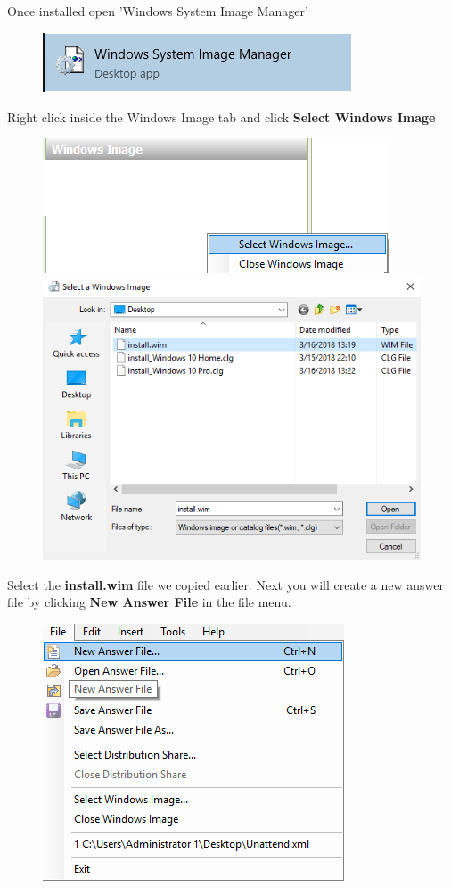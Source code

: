 \documentclass{article}
\begin{document}
\subsection{}
Once installed open 'Windows System Image Manager'
\begin{figure}[h]
	\includegraphics[width=.5\linewidth]{"sysprep/3-23-2018 13-21-27"}
\end{figure}
Right click inside the Windows Image tab and click \textbf{Select Windows Image}
\begin{figure}[h]
	\includegraphics[width=.5\linewidth]{"sysprep/3-23-2018 13-48-20"}
	\includegraphics[width=.5\linewidth]{"sysprep/3-23-2018 13-25-37"}
\end{figure}
\newline Select the \textbf{install.wim} file we copied earlier.
\newline Next you will create a new answer file by clicking \textbf{New Answer File} in the file menu.
\begin{figure}[h]
	\centering
	\includegraphics[width=.5\linewidth]{"sysprep/3-23-2018 13-26-37"}
\end{figure}
\end{document}
